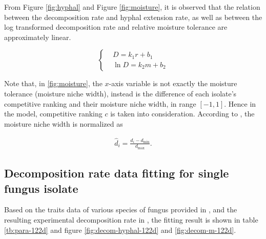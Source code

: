 From Figure \ref{fig:hyphal} and Figure \ref{fig:moisture}, it is observed that the relation between the decomposition rate and hyphal extension rate, as well as between the log transformed decomposition rate and relative moisture tolerance are approximately linear.

\begin{equation}\label{eq:decay-ability}
    \left\{\begin{aligned}
         & D = k_1r + b_1     \\
         & \ln D = k_2m + b_2
    \end{aligned}\right.
\end{equation}



Note that, in \ref{fig:moisture}, the $x$-axis variable is not exactly the moisture tolerance (moisture niche width), instead is the difference of each isolate’s competitive ranking and their moisture niche width, in range $[-1, 1]$. Hence in the model, competitive ranking $c$ is taken into consideration. According to \cite{Maynard-data}, the moisture niche width is normalized as

\begin{equation}
    \begin{aligned}
        \hat{d}_i =
        \frac{d_i - d_\text{min}}{d_\text{max}}.
    \end{aligned}
\end{equation}


\subsection{Decomposition rate data fitting for single fungus isolate}

Based on the traits data of various species of fungus provided in \cite{Maynard-data}, and the resulting experimental decomposition rate in \cite{Lustenshouwer}, the fitting result is shown in table \ref{tb:para-122d} and figure \ref{fig:decom-hyphal-122d} and \ref{fig:decom-m-122d}.

